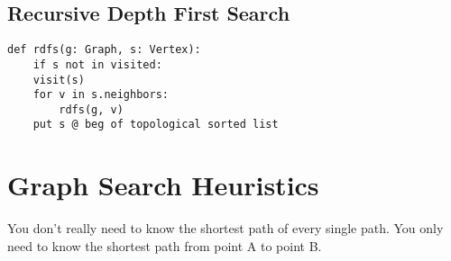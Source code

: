 \documentclass{article}
\begin{document}
\subsection{Recursive Depth First Search}
\label{sec:org09573c8}
\begin{verbatim}
def rdfs(g: Graph, s: Vertex):
    if s not in visited:
	visit(s)
	for v in s.neighbors:
	    rdfs(g, v)
	put s @ beg of topological sorted list
\end{verbatim}

\section{Graph Search Heuristics}
\label{sec:org2a7dc86}
You don't really need to know the shortest path of every single path. You only need to know the shortest 
path from point A to point B. 
\end{document}
